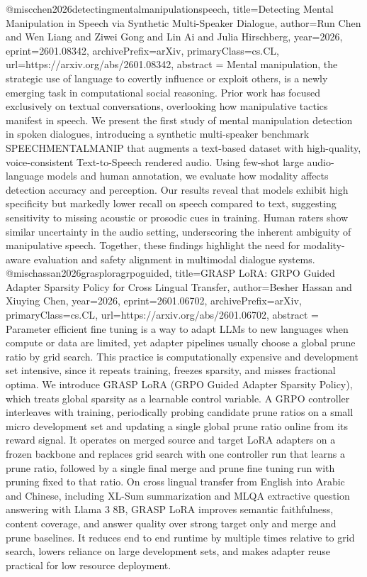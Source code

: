 {}@misc{chen2026detectingmentalmanipulationspeech,
      title={Detecting Mental Manipulation in Speech via Synthetic Multi-Speaker Dialogue}, 
      author={Run Chen and Wen Liang and Ziwei Gong and Lin Ai and Julia Hirschberg},
      year={2026},
      eprint={2601.08342},
      archivePrefix={arXiv},
      primaryClass={cs.CL},
      url={https://arxiv.org/abs/2601.08342},
      abstract = {Mental manipulation, the strategic use of language to covertly influence or exploit others, is a newly emerging task in computational social reasoning. Prior work has focused exclusively on textual conversations, overlooking how manipulative tactics manifest in speech. We present the first study of mental manipulation detection in spoken dialogues, introducing a synthetic multi-speaker benchmark SPEECHMENTALMANIP that augments a text-based dataset with high-quality, voice-consistent Text-to-Speech rendered audio. Using few-shot large audio-language models and human annotation, we evaluate how modality affects detection accuracy and perception. Our results reveal that models exhibit high specificity but markedly lower recall on speech compared to text, suggesting sensitivity to missing acoustic or prosodic cues in training. Human raters show similar uncertainty in the audio setting, underscoring the inherent ambiguity of manipulative speech. Together, these findings highlight the need for modality-aware evaluation and safety alignment in multimodal dialogue systems.}
}@misc{hassan2026grasploragrpoguided,
      title={GRASP LoRA: GRPO Guided Adapter Sparsity Policy for Cross Lingual Transfer}, 
      author={Besher Hassan and Xiuying Chen},
      year={2026},
      eprint={2601.06702},
      archivePrefix={arXiv},
      primaryClass={cs.CL},
      url={https://arxiv.org/abs/2601.06702},
      abstract = {Parameter efficient fine tuning is a way to adapt LLMs to new languages when compute or data are limited, yet adapter pipelines usually choose a global prune ratio by grid search. This practice is computationally expensive and development set intensive, since it repeats training, freezes sparsity, and misses fractional optima. We introduce GRASP LoRA (GRPO Guided Adapter Sparsity Policy), which treats global sparsity as a learnable control variable. A GRPO controller interleaves with training, periodically probing candidate prune ratios on a small micro development set and updating a single global prune ratio online from its reward signal. It operates on merged source and target LoRA adapters on a frozen backbone and replaces grid search with one controller run that learns a prune ratio, followed by a single final merge and prune fine tuning run with pruning fixed to that ratio. On cross lingual transfer from English into Arabic and Chinese, including XL-Sum summarization and MLQA extractive question answering with Llama 3 8B, GRASP LoRA improves semantic faithfulness, content coverage, and answer quality over strong target only and merge and prune baselines. It reduces end to end runtime by multiple times relative to grid search, lowers reliance on large development sets, and makes adapter reuse practical for low resource deployment.}
}
